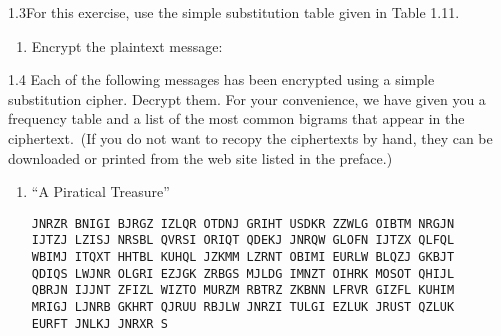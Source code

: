 \begin{exercise}
    {1.3}For this exercise, use the simple substitution table given in Table 1.11.
    \begin{enumerate}
        \item Encrypt the plaintext message:
    \end{enumerate}
\end{exercise}


\begin{exercise}
    {1.4} Each of the following messages has been encrypted using a simple substitution cipher. Decrypt them. For your convenience, we have given you a frequency table and a list of the most common bigrams that appear in the ciphertext.\ (If you do not want to recopy the ciphertexts by hand, they can be downloaded or printed from the web site listed in the preface.)
    \begin{enumerate}
        \item “A Piratical Treasure”
        \begin{flushleft}
            \texttt{JNRZR BNIGI BJRGZ IZLQR OTDNJ GRIHT USDKR ZZWLG OIBTM NRGJN} \\
            \texttt{IJTZJ LZISJ NRSBL QVRSI ORIQT QDEKJ JNRQW GLOFN IJTZX QLFQL} \\
            \texttt{WBIMJ ITQXT HHTBL KUHQL JZKMM LZRNT OBIMI EURLW BLQZJ GKBJT} \\
            \texttt{QDIQS LWJNR OLGRI EZJGK ZRBGS MJLDG IMNZT OIHRK MOSOT QHIJL} \\ 
            \texttt{QBRJN IJJNT ZFIZL WIZTO MURZM RBTRZ ZKBNN LFRVR GIZFL KUHIM} \\ 
            \texttt{MRIGJ LJNRB GKHRT QJRUU RBJLW JNRZI TULGI EZLUK JRUST QZLUK} \\ 
            \texttt{EURFT JNLKJ JNRXR S}
        \end{flushleft}
    \end{enumerate}
\end{exercise}


